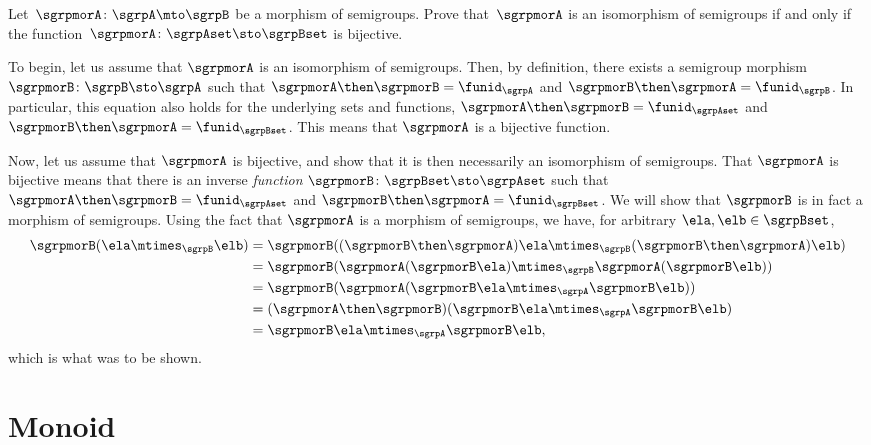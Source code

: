 \begin{gradedexercise}
  \label{ex:semi-morph}
  Let~$\sgrpmorA\colon \sgrpA \mto \sgrpB$ be a morphism of semigroups.
  Prove that~$\sgrpmorA$ is an isomorphism of semigroups if and only if the function~$\sgrpmorA \colon \sgrpAset \sto \sgrpBset$ is bijective.
\end{gradedexercise}
\begin{solution}
To begin, let us assume that $\sgrpmorA$ is an isomorphism of semigroups. Then, by definition, there exists a semigroup morphism $\sgrpmorB \colon \sgrpB \sto \sgrpA$ such that  $\sgrpmorA \then \sgrpmorB = \funid_\sgrpA$ and  $\sgrpmorB \then \sgrpmorA = \funid_\sgrpB$. In particular, this equation also holds for the underlying sets and functions, $\sgrpmorA \then \sgrpmorB = \funid_\sgrpAset$ and  $\sgrpmorB \then \sgrpmorA = \funid_\sgrpBset$. This means that $\sgrpmorA$ is a bijective function. 

Now, let us assume that $\sgrpmorA$ is bijective, and show that it is then necessarily an isomorphism of semigroups. That $\sgrpmorA$ is bijective means that there is an inverse \emph{function} $\sgrpmorB \colon \sgrpBset \sto \sgrpAset$ such that $\sgrpmorA \then \sgrpmorB = \funid_\sgrpAset$ and  $\sgrpmorB \then \sgrpmorA = \funid_\sgrpBset$. We will show that $\sgrpmorB$ is in fact a morphism of semigroups. Using the fact that $\sgrpmorA$ is a morphism of semigroups, we have, for arbitrary $\ela, \elb \in \sgrpBset$,
\begin{align*}
\sgrpmorB (\ela \mtimes_{\sgrpB} \elb) &= \sgrpmorB ( (\sgrpmorB \then \sgrpmorA) \ela \mtimes_{\sgrpB} (\sgrpmorB \then \sgrpmorA) \elb) \\
		& = \sgrpmorB ( \sgrpmorA ( \sgrpmorB \ela ) \mtimes_{\sgrpB} \sgrpmorA  ( \sgrpmorB \elb))  \\
		& = \sgrpmorB ( \sgrpmorA ( \sgrpmorB \ela  \mtimes_{\sgrpA}   \sgrpmorB \elb)) \\
		& = (\sgrpmorA \then  \sgrpmorB) ( \sgrpmorB \ela  \mtimes_{\sgrpA}   \sgrpmorB \elb) \\
		& = \sgrpmorB \ela  \mtimes_{\sgrpA}   \sgrpmorB \elb,
\end{align*}
which is what was to be shown. 
\end{solution}


\section{Monoid \whomos}

